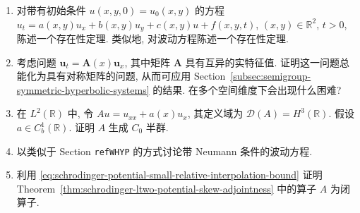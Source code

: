 \begin{enumerate}[label=\thesection.\arabic*.,ref=\thesection.\arabic*,start=15,series=book-problems]

\item\label{ex:semigroup-transport-and-wave-existence-statements} 对带有初始条件 $u(x,y,0)=u_0(x,y)$ 的方程 $u_t=a(x,y)u_x+b(x,y)u_y+c(x,y)u+f(x,y,t)$, $(x,y)\in\mathbb{R}^2$, $t>0$, 陈述一个存在性定理. 类似地, 对波动方程陈述一个存在性定理.

\item\label{ex:strict-hyperbolic-system-symmetric-transformation} 考虑问题 $\bm{u}_t=\bm{A}(x)\bm{u}_x$, 其中矩阵 $\bm{A}$ 具有互异的实特征值. 证明这一问题总能化为具有对称矩阵的问题, 从而可应用 Section~\ref{subsec:semigroup-symmetric-hyperbolic-systems} 的结果. 在多个空间维度下会出现什么困难?

\item\label{ex:second-order-drift-operator-hthree-domain-generation} 在 $L^2(\mathbb{R})$ 中, 令 $Au=u_{xx}+a(x)u_x$, 其定义域为 $\mathcal{D}(A)=H^3(\mathbb{R})$. 假设 $a\in C_b^1(\mathbb{R})$. 证明 $A$ 生成 $C_0$ 半群.

\item\label{ex:wave-neumann-source-unresolved-refwhyp} 以类似于 Section \texttt{refWHYP} 的方式讨论带 Neumann 条件的波动方程.

\item\label{ex:schrodinger-potential-operator-closedness} 利用 \eqref{eq:schrodinger-potential-small-relative-interpolation-bound} 证明 Theorem~\ref{thm:schrodinger-ltwo-potential-skew-adjointness} 中的算子 $A$ 为闭算子.

\end{enumerate}

